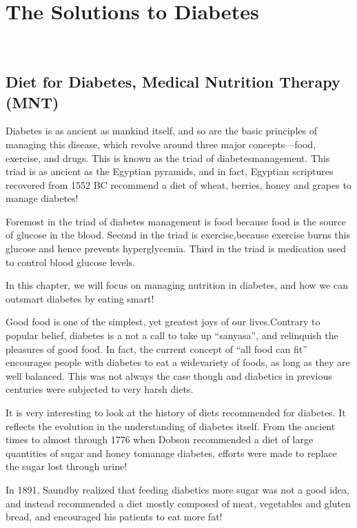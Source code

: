 
\part{The Solutions to Diabetes}

\newpage
~\phantom{a}
\thispagestyle{empty}
\newpage

\chapter{Diet for Diabetes, Medical Nutrition Therapy (MNT)}\label{chap22}

Diabetes is as ancient as mankind itself, and so are the basic principles of managing this disease, which revolve around three major concepts—food, exercise, and drugs. This is known as the triad of diabetes\break management. This triad is as ancient as the Egyptian pyramids, and in fact, Egyptian scriptures recovered from 1552 BC recommend a diet of wheat, berries, honey and grapes to manage diabetes!

Foremost in the triad of diabetes management is food because food is the source of glucose in the blood. Second in the triad is exercise,\break because exercise burns this glucose and hence prevents hyperglycemia. Third in the triad is medication used to control blood glucose levels.

In this chapter, we will focus on managing nutrition in diabetes, and how we can outsmart diabetes by eating smart!

Good food is one of the simplest, yet greatest joys of our lives.\break Contrary to popular belief, diabetes is a not a call to take up “sanyasa”, and relinquish the pleasures of good food. In fact, the current concept of “all food can fit” encourages people with diabetes to eat a wide\break variety of foods, as long as they are well balanced. This was not always the case though and diabetics in previous centuries were subjected to very harsh diets.


It is very interesting to look at the history of diets recommended for diabetes. It reflects the evolution in the understanding of diabetes itself. From the ancient times to almost through 1776 when Dobson recommended a diet of large quantities of sugar and honey to\break manage diabetes, efforts were made to replace the sugar lost through urine!

In 1891, Saundby realized that feeding diabetics more sugar was not a good idea, and instead recommended a diet mostly composed of meat, vegetables and gluten bread, and encouraged his patients to eat more fat!


